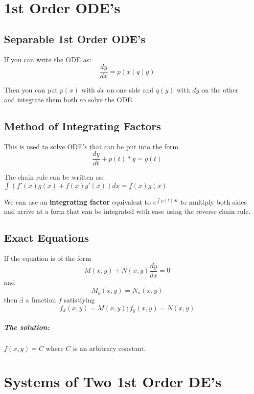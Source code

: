 \documentclass[a4paper,12pt]{report}
\begin{document}
\chapter{1st Order ODE's}
\section{Separable 1st Order ODE's}
If you can write the ODE as: $$\frac{dy}{dx} = p(x)q(y)$$

Then you can put $p(x)$ with $dx$ on one side and $q(y)$ with  $dy$ on the other and 
integrate them both so solve the ODE.

\section{Method of Integrating Factors}
This is used to solve ODE's that can be put into the form 
$$\frac{dy}{dt} + p(t)*y = g(t)$$

The chain rule can be written as: $\int (f'(x)g(x) + f(x)g'(x)) dx =  f(x)g(x)$

We can use an \textbf{integrating factor} equivalent to $e^{\int p(t) dt}$ to multiply
both sides and arrive at a form that can be integrated with ease using the reverse chain 
rule.

\section{Exact Equations}
If the equation is of the form $$M(x, y) + N(x, y) \frac{dy}{dx} = 0$$
and $$M_y(x, y) = N_x(x, y)$$ 
then $\exists$ a function $f$ satistfying $$f_x(x, y) = M(x, y); f_y(x, y) = N(x, y)$$

\paragraph{The solution: } $f(x, y) = C$ where $C$ is an arbitrary constant.

\chapter{Systems of Two 1st Order DE's}
\end{document}
